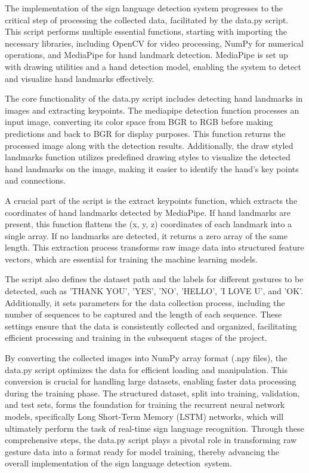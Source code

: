 The implementation of the sign language detection system progresses to the critical step of processing the collected data, facilitated by the data.py script. This script performs multiple essential functions, starting with importing the necessary libraries, including OpenCV for video processing, NumPy for numerical operations, and MediaPipe for hand landmark detection. MediaPipe is set up with drawing utilities and a hand detection model, enabling the system to detect and visualize hand landmarks effectively.

The core functionality of the data.py script includes detecting hand landmarks in images and extracting keypoints. The mediapipe detection function processes an input image, converting its color space from BGR to RGB before making predictions and back to BGR for display purposes. This function returns the processed image along with the detection results. Additionally, the draw styled landmarks function utilizes predefined drawing styles to visualize the detected hand landmarks on the image, making it easier to identify the hand's key points and connections.

A crucial part of the script is the extract keypoints function, which extracts the coordinates of hand landmarks detected by MediaPipe. If hand landmarks are present, this function flattens the (x, y, z) coordinates of each landmark into a single array. If no landmarks are detected, it returns a zero array of the same length. This extraction process transforms raw image data into structured feature vectors, which are essential for training the machine learning models.

The script also defines the dataset path and the labels for different gestures to be detected, such as 'THANK YOU', 'YES', 'NO', 'HELLO', 'I LOVE U', and 'OK'. Additionally, it sets parameters for the data collection process, including the number of sequences to be captured and the length of each sequence. These settings ensure that the data is consistently collected and organized, facilitating efficient processing and training in the subsequent stages of the project.

By converting the collected images into NumPy array format (.npy files), the data.py script optimizes the data for efficient loading and manipulation. This conversion is crucial for handling large datasets, enabling faster data processing during the training phase. The structured dataset, split into training, validation, and test sets, forms the foundation for training the recurrent neural network models, specifically Long Short-Term Memory (LSTM) networks, which will ultimately perform the task of real-time sign language recognition. Through these comprehensive steps, the data.py script plays a pivotal role in transforming raw gesture data into a format ready for model training, thereby advancing the overall implementation of the sign language detection system.

